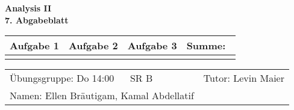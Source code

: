\documentclass[a4paper, 12pt]{scrartcl}
\begin{document}
\begin{center}
    \textbf{Analysis II\\7. Abgabeblatt}\\[2em]
	\def\arraystretch{2}
    \begin{tabular}{|l|l|l||p{18mm}|}
        \hline
         Aufgabe 1 & Aufgabe 2 & Aufgabe 3 & Summe:~ \\
         \hline &&&\\
         \hline  
    \end{tabular}
\end{center}
\begingroup
\def\arraystretch{1.5}
\begin{tabular}{p{}p{}}
	\hline
    Übungsgruppe: Do 14:00 ~~ SR B& Tutor: Levin Maier \\
    Namen: Ellen Bräutigam, Kamal Abdellatif &\\
    \hline
\end{tabular}
\endgroup\\
\end{document}
